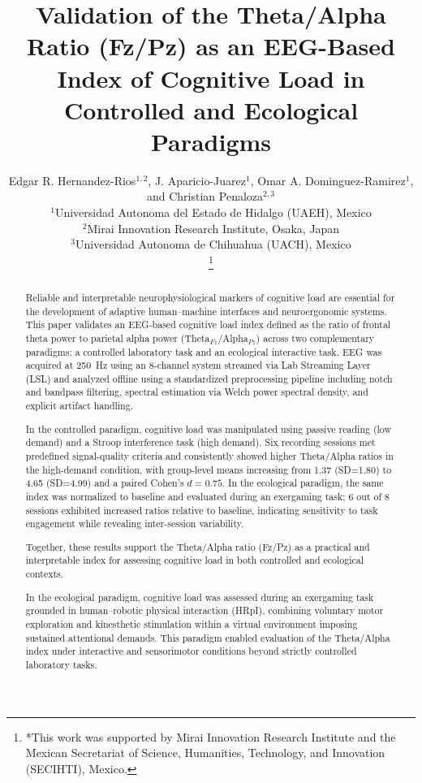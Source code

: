 \documentclass[letterpaper, 10 pt, conference]{ieeeconf}
\title{\LARGE \bf
Validation of the Theta/Alpha Ratio (Fz/Pz) as an EEG-Based Index of Cognitive Load in Controlled and Ecological Paradigms
}
\author{%
\parbox{\linewidth}{\centering
Edgar R. Hernandez-Rios$^{1,2}$, J. Aparicio-Juarez$^{1}$, Omar A. Dominguez-Ramirez$^{1}$, and Christian Penaloza$^{2,3}$\\
\vspace{1mm}
$^{1}$Universidad Autonoma del Estado de Hidalgo (UAEH), Mexico\\
$^{2}$Mirai Innovation Research Institute, Osaka, Japan\\
$^{3}$Universidad Autonoma de Chihuahua (UACH), Mexico
}\thanks{*This work was supported by Mirai Innovation Research Institute and the Mexican Secretariat of Science, Humanities, Technology, and Innovation (SECIHTI), Mexico.}%
%
}
\begin{document}
\maketitle
\thispagestyle{empty}
\pagestyle{empty}

\begin{abstract}
Reliable and interpretable neurophysiological markers of cognitive load are essential for the development of adaptive human--machine interfaces and neuroergonomic systems. This paper validates an EEG-based cognitive load index defined as the ratio of frontal theta power to parietal alpha power (Theta$_{Fz}$/Alpha$_{Pz}$) across two complementary paradigms: a controlled laboratory task and an ecological interactive task. EEG was acquired at 250~Hz using an 8-channel system streamed via Lab Streaming Layer (LSL) and analyzed offline using a standardized preprocessing pipeline including notch and bandpass filtering, spectral estimation via Welch power spectral density, and explicit artifact handling.

In the controlled paradigm, cognitive load was manipulated using passive reading (low demand) and a Stroop interference task (high demand). Six recording sessions met predefined signal-quality criteria and consistently showed higher Theta/Alpha ratios in the high-demand condition, with group-level means increasing from 1.37 (SD=1.80) to 4.65 (SD=4.99) and a paired Cohen’s $d=0.75$. In the ecological paradigm, the same index was normalized to baseline and evaluated during an exergaming task; 6 out of 8 sessions exhibited increased ratios relative to baseline, indicating sensitivity to task engagement while revealing inter-session variability.

Together, these results support the Theta/Alpha ratio (Fz/Pz) as a practical and interpretable index for assessing cognitive load in both controlled and ecological contexts.

In the ecological paradigm, cognitive load was assessed during an exergaming task grounded in human–robotic physical interaction (HRpI), combining voluntary motor exploration and kinesthetic stimulation within a virtual environment imposing sustained attentional demands. This paradigm enabled evaluation of the Theta/Alpha index under interactive and sensorimotor conditions beyond strictly controlled laboratory tasks.


\end{abstract}
\end{document}
